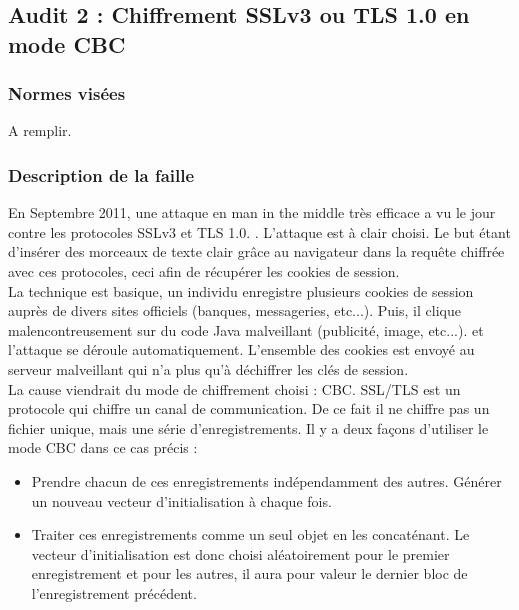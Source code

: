 	\subsection{Audit 2 : Chiffrement SSLv3 ou TLS 1.0 en mode CBC}
		\subsubsection{Normes visées}
	
			A remplir.	
	
		\subsubsection{Description de la faille}
			
			En Septembre 2011, une attaque en man in the middle très efficace a vu le jour contre les protocoles SSLv3 et TLS 1.0. \cite{ekr2011beast} \cite{imperial2011beast} \cite{goodin2011beast} \cite{gallagher2011beast}. L'attaque est à clair choisi. Le but étant d'insérer des morceaux de texte clair grâce au navigateur dans la requête chiffrée avec ces protocoles, ceci afin de récupérer les cookies de session.\\
			
			La technique est basique, un individu enregistre plusieurs cookies de session auprès de divers sites officiels (banques, messageries, etc...). Puis, il clique malencontreusement sur du code Java malveillant (publicité, image, etc...). et l'attaque se déroule automatiquement. L'ensemble des cookies est envoyé au serveur malveillant qui n'a plus qu'à déchiffrer les clés de session.\\
			
			La cause viendrait du mode de chiffrement choisi : CBC. SSL/TLS est un protocole qui chiffre un canal de communication.	De ce fait il ne chiffre pas un fichier unique, mais une série d'enregistrements. Il y a deux façons d'utiliser le mode CBC dans ce cas précis :
			\begin{itemize}
			\item Prendre chacun de ces enregistrements indépendamment des autres. Générer un nouveau vecteur d'initialisation à chaque fois.
			\item Traiter ces enregistrements comme un seul objet en les concaténant. Le vecteur d'initialisation est donc choisi aléatoirement pour le premier enregistrement et pour les autres, il aura pour valeur le dernier bloc de l'enregistrement précédent.\\
			
			\end{itemize}
			
